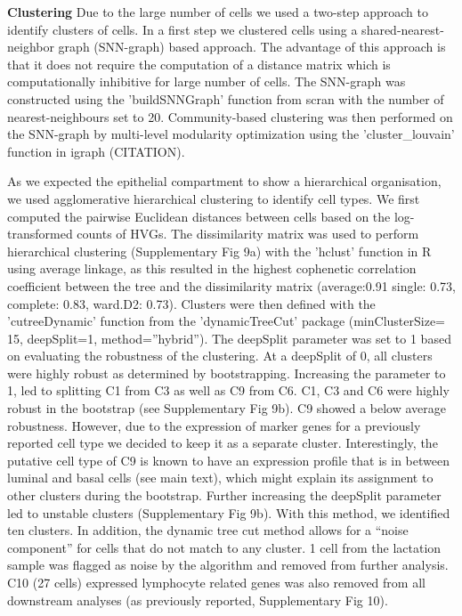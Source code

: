 \documentclass[titlepage, 12pt, oneside]{amsart}
\begin{document}
\textbf{Clustering}
Due to the large number of cells we used a two-step approach to identify clusters of cells.
In a first step we clustered cells using a shared-nearest-neighbor graph (SNN-graph) based approach.
The advantage of this approach is that it does not require the computation of a distance matrix which is computationally inhibitive for large number of cells.
The SNN-graph was constructed using the 'buildSNNGraph' function from scran with the number of nearest-neighbours set to 20.
Community-based clustering was then performed on the SNN-graph by multi-level modularity optimization using the 'cluster_louvain' function in igraph (CITATION).

As we expected the epithelial compartment to show a hierarchical organisation, we used agglomerative hierarchical clustering to identify cell types.
We first computed the pairwise Euclidean distances between cells based on the log-transformed counts of HVGs.
The dissimilarity matrix was used to perform hierarchical clustering (Supplementary Fig 9a) with the 'hclust' function in R using average linkage, as this resulted in the highest cophenetic correlation coefficient between the tree and the dissimilarity matrix (average:0.91 single: 0.73, complete: 0.83, ward.D2: 0.73).
Clusters were then defined with the 'cutreeDynamic' function from the 'dynamicTreeCut' package (minClusterSize= 15, deepSplit=1, method=''hybrid'')\autocite{Langfelder2008}.
The deepSplit parameter was set to 1 based on evaluating the robustness of the clustering.
At a deepSplit of 0, all clusters were highly robust as determined by bootstrapping\autocite{Henning2015}.
Increasing the parameter to 1, led to splitting C1 from C3 as well as C9 from C6.
C1, C3 and C6 were highly robust in the bootstrap (see Supplementary Fig 9b).
C9 showed a below average robustness.
However, due to the expression of marker genes for a previously reported cell type\autocite{Wang2015} we decided to keep it as a separate cluster.
Interestingly, the putative cell type of C9 is known to have an expression profile that is in between luminal and basal cells (see main text), which might explain its assignment to other clusters during the bootstrap.
Further increasing the deepSplit parameter led to unstable clusters (Supplementary Fig 9b).
With this method, we identified ten clusters. In addition, the dynamic tree cut method allows for a ``noise component'' for cells that do not match to any cluster.
1 cell from the lactation sample was flagged as noise by the algorithm and removed from further analysis.
C10 (27 cells) expressed lymphocyte related genes was also removed from all downstream analyses (as previously reported\autocite{Scheele2017}, Supplementary Fig 10).
\end{document}
